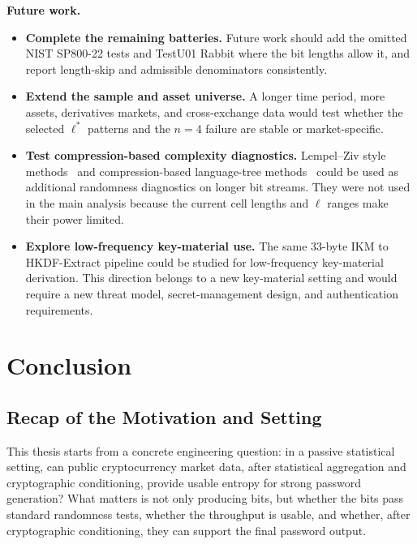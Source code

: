 \documentclass[11pt,titlepage,openany,oneside]{book}  %
\begin{document}
\textbf{Future work.}

\begin{itemize}
\item \textbf{Complete the remaining batteries.} Future work should add the omitted NIST SP800-22 tests and TestU01 Rabbit where the bit lengths allow it, and report length-skip and admissible denominators consistently.

\item \textbf{Extend the sample and asset universe.} A longer time period, more assets, derivatives markets, and cross-exchange data would test whether the selected $\ell^*$ patterns and the $n=4$ failure are stable or market-specific.

\item \textbf{Test compression-based complexity diagnostics.} Lempel--Ziv style methods~\citep{ziv1977lempelziv} and compression-based language-tree methods~\citep{benedetto2002language} could be used as additional randomness diagnostics on longer bit streams. They were not used in the main analysis because the current cell lengths and $\ell$ ranges make their power limited.

\item \textbf{Explore low-frequency key-material use.} The same 33-byte IKM to HKDF-Extract pipeline could be studied for low-frequency key-material derivation. This direction belongs to a new key-material setting and would require a new threat model, secret-management design, and authentication requirements.
\end{itemize}

\chapter{Conclusion}
\label{cha:conclusion}

\section{Recap of the Motivation and Setting}
\label{sec:conclusion-recap}

This thesis starts from a concrete engineering question: in a passive statistical setting, can public cryptocurrency market data, after statistical aggregation and cryptographic conditioning, provide usable entropy for strong password generation? What matters is not only producing bits, but whether the bits pass standard randomness tests, whether the throughput is usable, and whether, after cryptographic conditioning, they can support the final password output.
\end{document}

